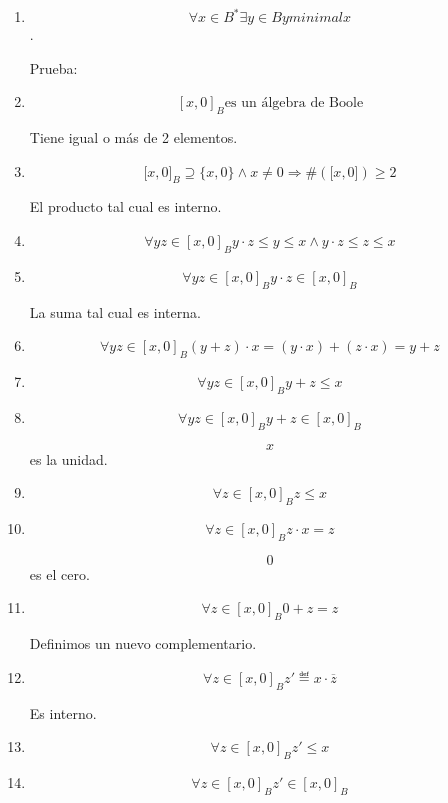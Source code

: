 \documentclass[
]{article}
\begin{document}
\begin{enumerate}
\begin{enumerate}
\begin{enumerate}
      \begin{enumerate}
      \def\labelenumiv{\arabic{enumiv}.}
      \item
        \[\forall{x \in B^{\ast}}\exists{y \in B}y\mathsf{\mathit{minimal}}x\].

        Prueba:
      \item
        \[\left\lbrack {x,0} \right\rbrack_{B}\text{es un álgebra de Boole}\]

        Tiene igual o más de 2 elementos.
      \item
        \[{{{\lbrack{x,0}\rbrack}_{B} \supseteq {{\{{x,0}\}} \land x}} \neq 0}\Rightarrow\#{{({\lbrack{x,0}\rbrack})} \geq 2}\]

        El producto tal cual es interno.
      \item
        \[\forall{\mathit{yz} \in \left\lbrack {x,0} \right\rbrack_{B}}{{{{{y \cdot z} \leq y} \leq {{x \land y} \cdot z}} \leq z} \leq x}\]
      \item
        \[\forall{\mathit{yz} \in \left\lbrack {x,0} \right\rbrack_{B}}{{y \cdot z} \in \left\lbrack {x,0} \right\rbrack_{B}}\]

        La suma tal cual es interna.
      \item
        \[\forall{\mathit{yz} \in \left\lbrack {x,0} \right\rbrack_{B}}{{{{({y + z})} \cdot x} = {{({y \cdot x})} + {({z \cdot x})}}} = {y + z}}\]
      \item
        \[\forall{\mathit{yz} \in \left\lbrack {x,0} \right\rbrack_{B}}{{y + z} \leq x}\]
      \item
        \[\forall{\mathit{yz} \in \left\lbrack {x,0} \right\rbrack_{B}}{{y + z} \in \left\lbrack {x,0} \right\rbrack_{B}}\]

        \[x\]es la unidad.
      \item
        \[\forall{z \in \left\lbrack {x,0} \right\rbrack_{B}}{z \leq x}\]
      \item
        \[\forall{z \in \left\lbrack {x,0} \right\rbrack_{B}}{{z \cdot x} = z}\]

        \[0\] es el cero.
      \item
        \[\forall{z \in \left\lbrack {x,0} \right\rbrack_{B}}{{0 + z} = z}\]

        Definimos un nuevo complementario.
      \item
        \[\forall{z \in \left\lbrack {x,0} \right\rbrack_{B}}{{z'} ≝ {x \cdot \overline{z}}}\]

        Es interno.
      \item
        \[\forall{z \in \left\lbrack {x,0} \right\rbrack_{B}}{{z'} \leq x}\]
      \item
        \[\forall{z \in \left\lbrack {x,0} \right\rbrack_{B}}{{z'} \in \left\lbrack {x,0} \right\rbrack_{B}}\]


\end{enumerate}
\end{enumerate}
\end{enumerate}
\end{enumerate}
\end{document}
